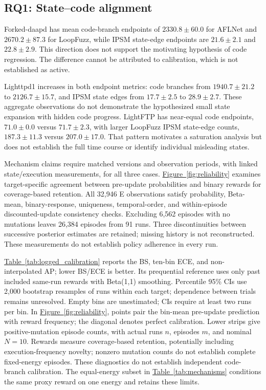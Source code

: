 \documentclass[final,5p,times,number]{elsarticle}
\newcommand{\namedref}[2]{\hyperref[#2]{#1~\ref*{#2}}}
\begin{document}
\subsection{RQ1: State--code alignment}
Forked-daapd has mean code-branch endpoints of $2330.8\pm60.0$ for AFLNet and $2670.2\pm87.3$ for LoopFuzz, while IPSM state-edge endpoints are $21.6\pm2.1$ and $22.8\pm2.9$. This direction does not support the motivating hypothesis of code regression. The difference cannot be attributed to calibration, which is not established as active.

Lighttpd1 increases in both endpoint metrics: code branches from $1940.7\pm21.2$ to $2126.7\pm15.7$, and IPSM state edges from $17.7\pm2.5$ to $28.9\pm2.7$. These aggregate observations do not demonstrate the hypothesized small state expansion with hidden code progress. LightFTP has near-equal code endpoints, $71.0\pm0.0$ versus $71.7\pm2.3$, with larger LoopFuzz IPSM state-edge counts, $187.3\pm11.3$ versus $207.0\pm17.0$. That pattern motivates a saturation analysis but does not establish the full time course or identify individual misleading states.

Mechanism claims require matched versions and observation periods, with linked state/execution measurements, for all three cases. \namedref{Figure}{fig:reliability} examines target-specific agreement between pre-update probabilities and binary rewards for coverage-based retention. All 32,946 E observations satisfy probability, Beta-mean, binary-response, uniqueness, temporal-order, and within-episode discounted-update consistency checks. Excluding 6,562 episodes with no mutations leaves 26,384 episodes from 91 runs. Three discontinuities between successive posterior estimates are retained; missing history is not reconstructed. These measurements do not establish policy adherence in every run.

\namedref{Table}{tab:logged_calibration} reports the BS, ten-bin ECE, and non-interpolated AP; lower BS/ECE is better. Its prequential reference uses only past included same-run rewards with Beta(1,1) smoothing. Percentile 95\% CIs use 2,000 bootstrap resamples of runs within each target; dependence between trials remains unresolved. Empty bins are unestimated; CIs require at least two runs per bin. In \namedref{Figure}{fig:reliability}, points pair the bin-mean pre-update prediction with reward frequency; the diagonal denotes perfect calibration. Lower strips give positive-mutation episode counts, with actual runs $n$, episodes $m$, and nominal $N=10$. Rewards measure coverage-based retention, potentially including execution-frequency novelty; nonzero mutation counts do not establish complete fixed-energy episodes. These diagnostics do not establish independent code-branch calibration. The equal-energy subset in \namedref{Table}{tab:mechanisms} conditions the same proxy reward on one energy and retains these limits.
\end{document}
